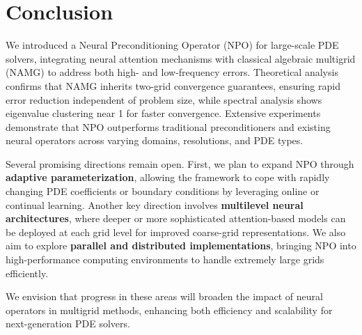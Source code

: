 \section{Conclusion}
We introduced a Neural Preconditioning Operator (NPO) for large-scale PDE solvers, integrating neural attention mechanisms with classical algebraic multigrid (NAMG) to address both high- and low-frequency errors. Theoretical analysis confirms that NAMG inherits two-grid convergence guarantees, ensuring rapid error reduction independent of problem size, while spectral analysis shows eigenvalue clustering near 1 for faster convergence. Extensive experiments demonstrate that NPO outperforms traditional preconditioners and existing neural operators across varying domains, resolutions, and PDE types.

Several promising directions remain open. First, we plan to expand NPO through \textbf{adaptive parameterization}, allowing the framework to cope with rapidly changing PDE coefficients or boundary conditions by leveraging online or continual learning. Another key direction involves \textbf{multilevel neural architectures}, where deeper or more sophisticated attention-based models can be deployed at each grid level for improved coarse-grid representations. We also aim to explore \textbf{parallel and distributed implementations}, bringing NPO into high-performance computing environments to handle extremely large grids efficiently. 

We envision that progress in these areas will broaden the impact of neural operators in multigrid methods, enhancing both efficiency and scalability for next-generation PDE solvers.
